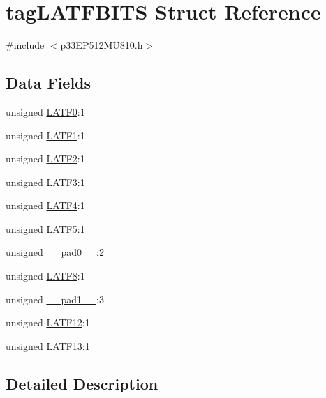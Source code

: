 \hypertarget{structtag_l_a_t_f_b_i_t_s}{}\section{tag\+L\+A\+T\+F\+B\+I\+TS Struct Reference}
\label{structtag_l_a_t_f_b_i_t_s}


{\ttfamily \#include $<$p33\+E\+P512\+M\+U810.\+h$>$}

\subsection*{Data Fields}
\begin{DoxyCompactItemize}
\item 
unsigned \hyperlink{structtag_l_a_t_f_b_i_t_s_a8ff770466849fc1575536a2ece130857}{L\+A\+T\+F0}\+:1
\item 
unsigned \hyperlink{structtag_l_a_t_f_b_i_t_s_a56c76e183d1cc3da5afc67d7aa1f8fff}{L\+A\+T\+F1}\+:1
\item 
unsigned \hyperlink{structtag_l_a_t_f_b_i_t_s_afafb500c66d5b11a964fd098235bbc7f}{L\+A\+T\+F2}\+:1
\item 
unsigned \hyperlink{structtag_l_a_t_f_b_i_t_s_a735b917c68caee5f1e5f142211835c68}{L\+A\+T\+F3}\+:1
\item 
unsigned \hyperlink{structtag_l_a_t_f_b_i_t_s_a9500eb5d0ba657938101501ac2424f75}{L\+A\+T\+F4}\+:1
\item 
unsigned \hyperlink{structtag_l_a_t_f_b_i_t_s_a130a299221d85798c4e26a9587015029}{L\+A\+T\+F5}\+:1
\item 
unsigned \hyperlink{structtag_l_a_t_f_b_i_t_s_adf71f3d8410c1f1dbbc96680a92c49af}{\+\_\+\+\_\+pad0\+\_\+\+\_\+}\+:2
\item 
unsigned \hyperlink{structtag_l_a_t_f_b_i_t_s_a91a8101ef37936d3e787b2c8adccdbbf}{L\+A\+T\+F8}\+:1
\item 
unsigned \hyperlink{structtag_l_a_t_f_b_i_t_s_acaf2d0924a107ec6e8d2e31febaf66f9}{\+\_\+\+\_\+pad1\+\_\+\+\_\+}\+:3
\item 
unsigned \hyperlink{structtag_l_a_t_f_b_i_t_s_ab1a714de5deafde29f528a8efdede618}{L\+A\+T\+F12}\+:1
\item 
unsigned \hyperlink{structtag_l_a_t_f_b_i_t_s_acddd2d66857f74f9fc0fdf2ebbfb01c0}{L\+A\+T\+F13}\+:1
\end{DoxyCompactItemize}


\subsection{Detailed Description}


